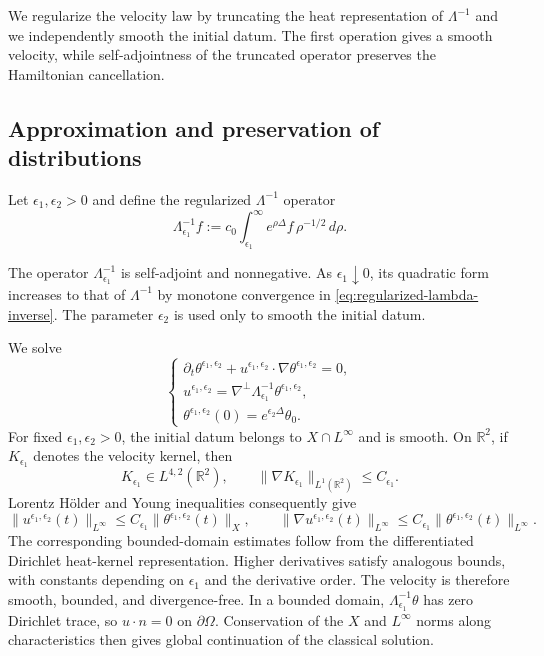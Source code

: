 \documentclass[11pt,reqno]{amsproc}
\newcommand{\R}{\mathbb R}
\newcommand{\Om}{\Omega}
\newcommand{\dd}{\,d}
\newcommand{\Lam}{\Lambda}
\begin{document}
We regularize the velocity law by truncating the heat representation of $\Lambda^{-1}$ and
we independently smooth the initial datum.  The first operation gives a smooth
velocity, while self-adjointness of the truncated operator preserves the
Hamiltonian cancellation.

\subsection{Approximation and preservation of distributions}

Let $\epsilon_1,\epsilon_2>0$ and define the regularized $\Lambda^{-1}$  operator
\begin{equation}\label{eq:regularized-lambda-inverse}
  \Lam_{\epsilon_1}^{-1}f
  :=c_0\int_{\epsilon_1}^\infty e^{\rho\Delta}f\,\rho^{-1/2}\dd\rho .
\end{equation}

 The operator $\Lam_{\epsilon_1}^{-1}$ is self-adjoint and
nonnegative.  As $\epsilon_1\downarrow0$, its quadratic form increases to that
of $\Lam^{-1}$ by monotone convergence in
\eqref{eq:regularized-lambda-inverse}.  The parameter $\epsilon_2$ is used only
to smooth the initial datum.

We solve
\begin{equation}\label{eq:approximation}
  \begin{cases}
  \partial_t\theta^{\epsilon_1,\epsilon_2}
  +u^{\epsilon_1,\epsilon_2}\cdot\nabla\theta^{\epsilon_1,\epsilon_2}=0,\\[2mm]
  u^{\epsilon_1,\epsilon_2}
  =\nabla^\perp\Lam_{\epsilon_1}^{-1}\theta^{\epsilon_1,\epsilon_2},\\[2mm]
  \theta^{\epsilon_1,\epsilon_2}(0)=e^{\epsilon_2\Delta}\theta_0.
  \end{cases}
\end{equation}
\begingroup
For fixed $\epsilon_1,
\epsilon_2>0$, the initial datum belongs to $X\cap L^\infty$ and is smooth.
On $\R^2$, if $K_{\epsilon_1}$ denotes the velocity kernel, then
\[
  K_{\epsilon_1}\in L^{4,2}(\R^2),
  \qquad
  \|\nabla K_{\epsilon_1}\|_{L^1(\R^2)}\leq C_{\epsilon_1}.
\]
Lorentz H\"older and Young inequalities consequently give
\[
 \|u^{\epsilon_1,\epsilon_2}(t)\|_{L^\infty}
 \leq C_{\epsilon_1}\|\theta^{\epsilon_1,\epsilon_2}(t)\|_X,
 \qquad
 \|\nabla u^{\epsilon_1,\epsilon_2}(t)\|_{L^\infty}
 \leq C_{\epsilon_1}
 \|\theta^{\epsilon_1,\epsilon_2}(t)\|_{L^\infty}.
\]
The corresponding bounded-domain estimates follow from the differentiated
Dirichlet heat-kernel representation.  Higher derivatives satisfy analogous
bounds, with constants depending on $\epsilon_1$ and the derivative order.
The velocity is therefore smooth, bounded, and divergence-free.  In a bounded
domain, $\Lam_{\epsilon_1}^{-1}\theta$ has zero Dirichlet trace, so
$u\cdot n=0$ on $\partial\Om$.  Conservation of the $X$ and $L^\infty$ norms
along characteristics then gives global continuation of the classical
solution.
\endgroup
\end{document}
